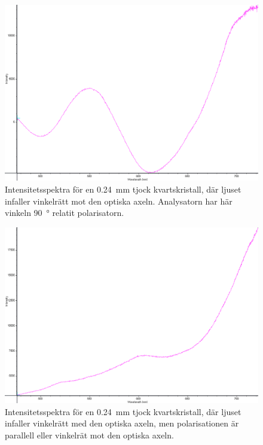 \documentclass[a4paper]{article}
\begin{document}
\FloatBarrier
\begin{figure}[ht!]
	\centering
	\includegraphics[width=\linewidth]{data/spektra_180_kristall1_270_inv}
	\caption{Intensitetsspektra för en \SI{0.24}{\milli\m} tjock kvartskristall, där ljuset infaller vinkelrätt mot den optiska axeln. Analysatorn har här vinkeln \SI{+90}{\degree} relatit polarisatorn.}
	\label{fig:k1_90}
\end{figure}
\FloatBarrier

\FloatBarrier
\begin{figure}[ht!]
	\centering
	\includegraphics[width=\linewidth]{data/spektra_kristall1_optAx_inv}
	\caption{Intensitetsspektra för en \SI{0.24}{\milli\m} tjock kvartskristall, där ljuset infaller vinkelrätt med den optiska axeln, men polarisationen är parallell eller vinkelrät mot den optiska axeln.}
	\label{fig:k1OptAx}
\end{figure}
\FloatBarrier
\end{document}
